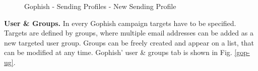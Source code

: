 \documentclass[a4paper]{article}
\begin{document}
\begin{figure}[H]
	\centering
	\caption{Gophish - Sending Profiles - New Sending Profile}
	\label{gop-spnsp}
\end{figure}

\noindent
\textbf{User \& Groups.} In every Gophish campaign targets have to be specified. Targets are defined by groups, where multiple email addresses can be added as a new targeted user group. Groups can be freely created and appear on a list, that can be modified at any time. Gophish' user \& groups tab is shown in Fig. \ref{gop-ug}.
\end{document}
